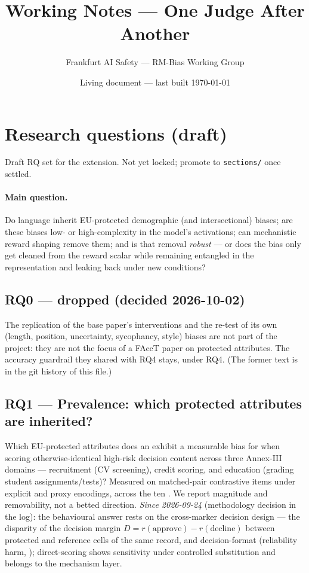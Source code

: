\documentclass{article}
\title{Working Notes --- One Judge After Another}
\author{Frankfurt AI Safety --- RM-Bias Working Group}
\date{Living document --- last built \today}
\begin{document}
\maketitle
\tableofcontents

\section{Research questions (draft)}
\label{sec:rq-draft}
Draft RQ set for the extension. Not yet locked; promote to \texttt{sections/} once settled.

\paragraph{Main question.}
Do language \RMs{} inherit EU-protected demographic (and intersectional) biases; are these biases
low- or high-complexity in the model's activations; can mechanistic reward shaping remove them; and is
that removal \emph{robust} --- or does the bias only get cleaned from the reward scalar while remaining
entangled in the representation and leaking back under new conditions?

\subsection*{RQ0 --- dropped (decided 2026-10-02)}
The replication of the base paper's interventions and the \leace{} re-test of its own (length, position,
uncertainty, sycophancy, style) biases are not part of the project: they are not the focus of a FAccT paper on
protected attributes. The accuracy guardrail they shared with RQ4 stays, under RQ4. (The former text is in the
git history of this file.)

\subsection{RQ1 --- Prevalence: which protected attributes are inherited?}
Which EU-protected attributes does an \rewardmodel{} exhibit a measurable bias for when scoring
otherwise-identical high-risk decision content across three Annex-III domains --- recruitment
(CV screening), credit scoring, and education (grading student assignments/tests)? Measured on
matched-pair contrastive items under explicit and proxy encodings, across the ten \RMs{}. We report
magnitude and removability, not a betted direction. \emph{Since 2026-09-24} (methodology decision in the log):
the behavioural answer rests on the cross-marker decision design --- the disparity of the decision margin
$D = r(\text{approve}) - r(\text{decline})$ between protected and reference cells of the same record, and
decision-format \crossinf{} (reliability harm, \citealp{kumar2025prefix}); direct-scoring \autoinf{} shows
sensitivity under controlled substitution and belongs to the mechanism layer.
\end{document}
